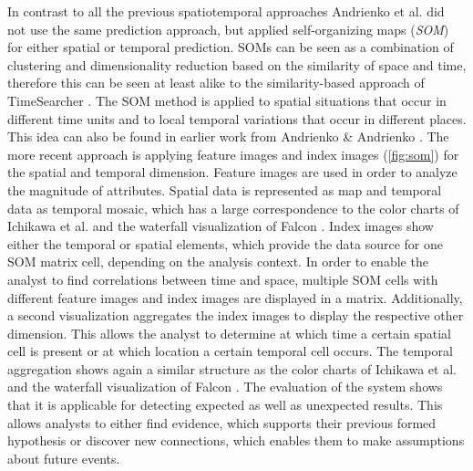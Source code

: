 \documentclass[electronic]{vgtc}             %
\begin{document}
In contrast to all the previous spatiotemporal approaches Andrienko et al. \cite{Andrienko:2010:Space} did not use the same prediction approach, but applied self-organizing maps (\textit{SOM}) for either spatial or temporal prediction.
SOMs can be seen as a combination of clustering and dimensionality reduction based on the similarity of space and time, therefore this can be seen at least alike to the similarity-based approach of TimeSearcher \cite{Hochheiser:2004, buono:2007, buono:2005}.
The SOM method is applied to spatial situations that occur in different time units and to local temporal variations that occur in different places.
This idea can also be found in earlier work from Andrienko \& Andrienko \cite{Andrienko:2005}.
The more recent approach is applying feature images and index images (\autoref{fig:som}) for the spatial and temporal dimension.
Feature images are used in order to analyze the magnitude of attributes.
Spatial data is represented as map and temporal data as temporal mosaic, which has a large correspondence to the color charts of Ichikawa et al. \cite{ichikawa:2002} and the waterfall visualization of Falcon \cite{steed:2017}.
Index images show either the temporal or spatial elements, which provide the data source for one SOM matrix cell, depending on the analysis context.
In order to enable the analyst to find correlations between time and space, multiple SOM cells with different feature images and index images are displayed in a matrix.
Additionally, a second visualization aggregates the index images to display the respective other dimension.
This allows the analyst to determine at which time a certain spatial cell is present or at which location a certain temporal cell occurs.
The temporal aggregation shows again a similar structure as the color charts of Ichikawa et al. \cite{ichikawa:2002} and the waterfall visualization of Falcon \cite{steed:2017}.
The evaluation of the system shows that it is applicable for detecting expected as well as unexpected results.
This allows analysts to either find evidence, which supports their previous formed hypothesis or discover new connections, which enables them to make assumptions about future events. 
\end{document}
